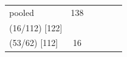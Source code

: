 \begin{tabularx}{\linewidth}{@{}lcccc>{\raggedright\arraybackslash}X@{}}
\midrule
pooled & 138 & \begin{tabular}[t]{@{}c@{}}$+1.64$\\{\scriptsize(16/112) [122]}\end{tabular} & \begin{tabular}[t]{@{}c@{}}$-0.16$\\{\scriptsize(53/62) [112]}\end{tabular} & 16 & \\
\bottomrule
\end{tabularx}
